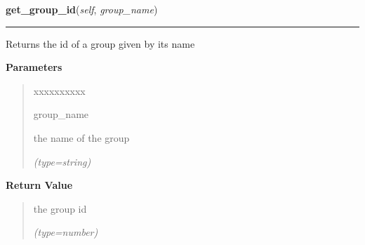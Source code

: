 \hspace{.8\funcindent}\begin{boxedminipage}{\funcwidth}

    \raggedright \textbf{get\_group\_id}(\textit{self}, \textit{group\_name})

    \vspace{-1.5ex}

    \rule{\textwidth}{0.5\fboxrule}
\setlength{\parskip}{2ex}
    Returns the id of a group given by its name

\setlength{\parskip}{1ex}
      \textbf{Parameters}
      \vspace{-1ex}

      \begin{quote}
        \begin{Ventry}{xxxxxxxxxx}

          \item[group\_name]

          the name of the group

            {\it (type=string)}

        \end{Ventry}

      \end{quote}

      \textbf{Return Value}
    \vspace{-1ex}

      \begin{quote}
      the group id

      {\it (type=number)}

      \end{quote}

    \end{boxedminipage}

    \label{DBE:DBE:get_user_settings}

    \vspace{0.5ex}

